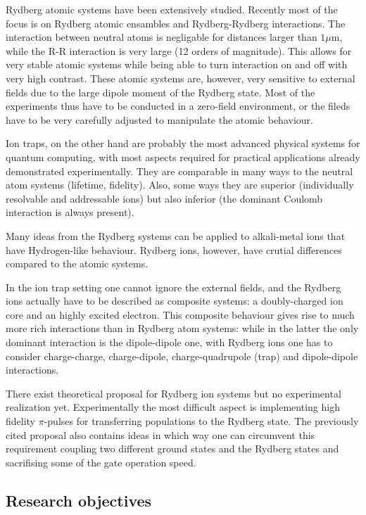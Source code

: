 Rydberg atomic systems have been extensively studied. Recently most of the focus is on Rydberg atomic ensambles and Rydberg-Rydberg interactions. The interaction between neutral atoms is negligable for distances larger than $1 \mu {\mathrm m}$, while the R-R interaction is very large (12 orders of magnitude). This allows for very stable atomic systems while being able to turn interaction on and off with very high contrast. These atomic systems are, however, very sensitive to external fields due to the large dipole moment of the Rydberg state. Most of the experiments thus have to be conducted in a zero-field environment, or the fileds have to be very carefully adjusted to manipulate the atomic behaviour.

Ion traps, on the other hand are probably the most advanced physical systems for quantum computing, with most aspects required for practical applications already demonstrated experimentally. They are comparable in many ways to the neutral atom systems (lifetime, fidelity). Also, some ways they are superior (individually resolvable and addressable ions) but also inferior (the dominant Coulomb interaction is always present).

Many ideas from the Rydberg systems can be applied to alkali-metal ions that have Hydrogen-like behaviour. Rydberg ions, however, have crutial differences compared to the atomic systems.

In the ion trap setting one cannot ignore the external fields, and the Rydberg ions actually have to be described as composite systems: a doubly-charged ion core and an highly excited electron. This composite behaviour gives rise to much more rich interactions than in Rydberg atom systems: while in the latter the only dominant interaction is the dipole-dipole one, with Rydberg ions one has to consider charge-charge, charge-dipole, charge-quadrupole (trap) and dipole-dipole interactions.

There exist theoretical proposal for Rydberg ion systems \cite{Mueller2008} but no experimental realization yet. Experimentally the most difficult aspect is implementing high fidelity $\pi$-pulses for transferring populations to the Rydberg state. The previously cited proposal also contains ideas in which way one can circumvent this requirement coupling two different ground states and the Rydberg states and sacrifising some of the gate operation speed.





\subsection{Research objectives}

